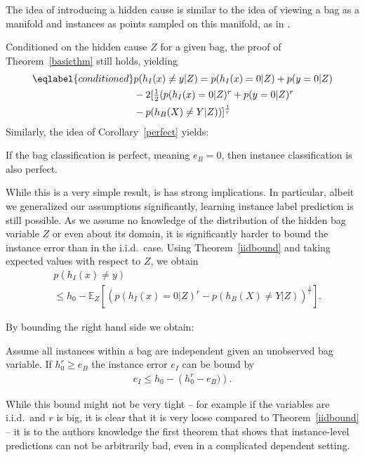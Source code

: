The idea of introducing a hidden cause is similar to the idea of viewing a bag as a manifold and instances as points
sampled on this manifold, as in \citet{ICML2011Babenko_74}.

Conditioned on the hidden cause $Z$ for a given bag, the proof of Theorem~\ref{basicthm} still holds, yielding
\begin{align}\eqlabel{conditioned}
&p(h_I(x) \neq y | Z) =p(h_I(x)=0|Z) + p(y=0|Z)\\
&\textstyle- 2  [\frac{1}{2} ( p(h_I(x)=0|Z)^r + p(y=0|Z)^r\\
& - p(h_B(X) \neq Y|Z)) ]^\frac{1}{r}
\end{align}
Similarly, the idea of Corollary~\ref{perfect} yields:

\begin{corollary}\label{perfect}
If the bag classification is perfect, meaning $e_B=0$, then instance classification is also perfect.
\end{corollary}

While this is a very simple result, is has strong implications. In particular, albeit we generalized our
assumptions significantly, learning instance label prediction is still possible.
As we assume no knowledge of the distribution of the hidden bag variable $Z$ or even about its domain, it is significantly harder
to bound the instance error than in the i.i.d.\ case.
Using Theorem~\ref{iidbound} and taking expected values with respect to $Z$, we obtain
\begin{align}
    & p(h_I(x)\neq y) \\\
    & \leq h_0 - \mathbb{E}_Z \left [\left ( p(h_I(x)=0 | Z)^r - p(h_B(X)\neq Y|Z) \right ) ^ \frac{1}{r} \right ].
\end{align}

By bounding the right hand side we obtain:
\begin{theorem}\label{bound}
    Assume all instances within a bag are independent given an unobserved bag variable. If $h_0^r \geq e_B$ the instance error $e_I$ can
    be bound by
\begin{align}
    e_I \leq h_0 -  \left ( h_0^r - e_B) \right ).
\end{align}
\end{theorem}
While this bound might not be very tight -- for example if the variables are i.i.d.\ and $r$ is big, it is clear
that it is very loose compared to Theorem~\ref{iidbound} -- it is to the authors knowledge the first theorem that shows that instance-level
predictions can not be arbitrarily bad, even in a complicated dependent setting.

